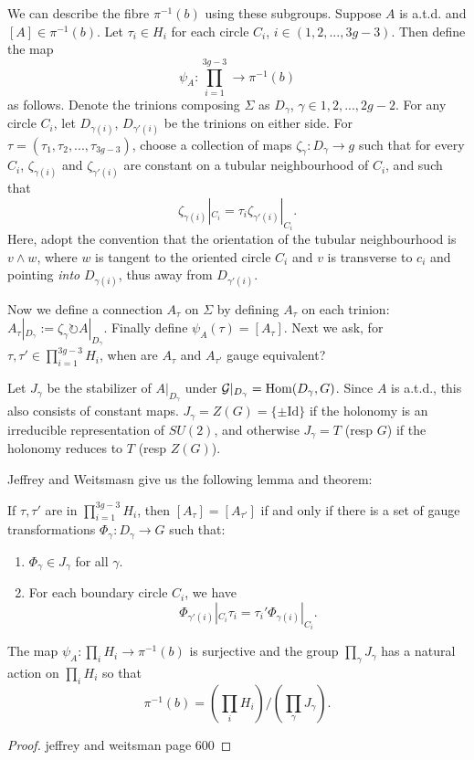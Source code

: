 	We can describe the fibre $\pi^{-1}(b)$ using these subgroups. Suppose $A$ is a.t.d. and $[A] \in \pi^{-1}(b)$. Let $\tau_i \in H_i$ for each circle $C_i$, $i\in (1,2,...,3g-3)$. Then define the map
	\begin{equation}
		\label{e:psiA}
		\psi_A : \prod_{i=1}^{3g-3} \to \pi^{-1}(b)
	\end{equation}
	as follows. Denote the trinions composing $\Sigma$ as $D_{\gamma}$, $\gamma\in{1,2,...,2g-2}$. For any circle $C_i$, let $D_{\gamma(i)}$, $D_{\gamma'(i)}$ be the trinions on either side. For $\tau=(\tau_1,\tau_2,...,\tau_{3g-3})$, choose a collection of maps $\zeta_\gamma : D_\gamma \to g$ such that for every $C_i$, $\zeta_{\gamma(i)}$ and $\zeta_{\gamma'(i)}$ are constant on a tubular neighbourhood of $C_i$, and such that
	\begin{equation}
		\zeta_{\gamma(i)}|_{C_i} = \tau_i \zeta_{\gamma'(i)}|_{C_i}.
	\end{equation}
	Here, adopt the convention that the orientation of the tubular neighbourhood is $v\wedge w$, where $w$ is tangent to the oriented circle $C_i$ and $v$ is transverse to $c_i$ and pointing \textit{into} $D_{\gamma(i)}$, thus away from $D_{\gamma'(i)}$.
	
	Now we define a connection $A_\tau$ on $\Sigma$ by defining $A_\tau$ on each trinion: $A_\tau|_{D_\gamma} := \zeta_\gamma \circlearrowright A|_{D_\gamma}$. Finally define $\psi_A(\tau) = [A_\tau]$. Next we ask, for $\tau,\tau' \in \prod_{i=1}^{3g-3} H_i$, when are $A_\tau$ and $A_{\tau'}$ gauge equivalent? 
	
	Let $J_\gamma$ be the stabilizer of $A|_{D_\gamma}$ under $\mathcal{G}|_{D_\gamma} = \text{Hom}(D_\gamma,G)$. Since $A$ is a.t.d., this also consists of constant maps. $J_\gamma = Z(G) = \{\pm \text{Id}\}$ if the holonomy is an irreducible representation of $SU(2)$, and otherwise $J_\gamma =T$ (resp $G$) if the holonomy reduces to $T$ (resp $Z(G)$).  
	
	Jeffrey and Weitsmasn give us the following lemma and theorem:
	\begin{theorem}
		If $\tau,\tau'$ are in $\prod_{i=1}^{3g-3} H_i$, then $[A_\tau] = [A_{\tau'}]$ if and only if there is a set of gauge transformations $\Phi_\gamma:D_\gamma \to G$ such that:
		\begin{enumerate}
			\item $\Phi_\gamma \in J_\gamma$ for all $\gamma$.
			\item For each boundary circle $C_i$, we have
			$$
				\Phi_{\gamma'(i)}|_{C_i} \tau_i = \tau_i' \Phi_{\gamma(i)}|_{C_i}.
			$$
		\end{enumerate}
	\end{theorem} 
	\begin{theorem}
		The map $\psi_A:\prod_i H_i \to \pi^{-1}(b)$ is surjective and the group $\prod_\gamma J_\gamma$ has a natural action on $\prod_i H_i$ so that
		\begin{equation}
			\pi^{-1}(b) = \left(\prod_i H_i\right)/\left(\prod_\gamma J_\gamma\right).
		\end{equation}
	\end{theorem}
	\begin{proof}
		jeffrey and weitsman page 600
	\end{proof}


